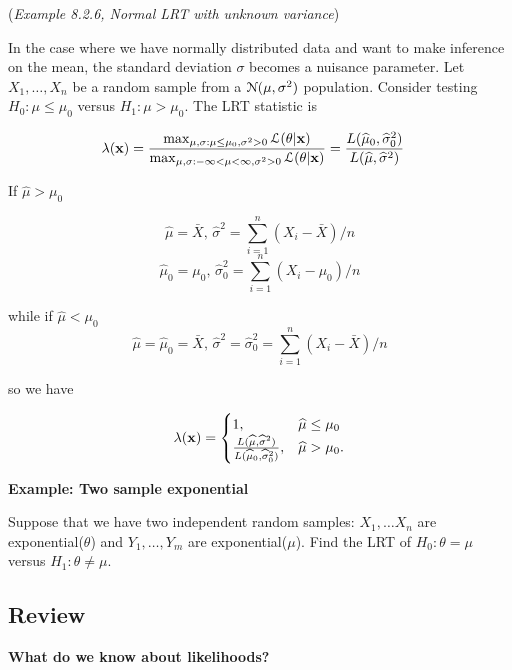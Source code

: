 \documentclass[11pt,]{article}
\def\bx{{\bf x}}
\def\muhat{{\widehat\mu}}
\def\sigmahat{{\widehat\sigma}}
\def\Xbar{\bar{ X}}
\def\Lsc{{\cal L}}
\def\Nsc{{\cal N}}
\def\sumin{\sum_{i=1}^n}
\begin{document}
 (\emph{Example 8.2.6, Normal LRT with unknown
variance})

In the case where we have normally distributed data and want to make
inference on the mean, the standard deviation \(\sigma\) becomes a
nuisance parameter. Let \(X_1, \ldots, X_n\) be a random sample from a
\(\Nsc(\mu,\sigma^2)\) population. Consider testing
\(H_0: \mu \leq \mu_0\) versus \(H_1: \mu > \mu_0\). The LRT statistic
is

\begin{align*}
\lambda(\bx) &= \frac{\max_{\mu, \sigma: \mu \leq\mu_0, \sigma^2 >0 } \Lsc(\theta | \bx)}{\max_{\mu, \sigma: -\infty < \mu < \infty, \sigma^2 > 0} \Lsc(\theta | \bx)} 
= \frac{L(\muhat_0, \sigmahat_0^2)}{L(\muhat, \sigmahat^2)}
\end{align*}

If \(\muhat > \mu_0\)

\[\muhat = \Xbar, \, \sigmahat^2 = \sumin(X_i - \Xbar)/n\]
\[\muhat_0 = \mu_0, \, \sigmahat_0^2 = \sumin(X_i - \mu_0)/n\]

while if \(\muhat < \mu_0\)
\[\muhat = \muhat_0 = \Xbar, \, \sigmahat^2 = \sigmahat_0^2 = \sumin(X_i - \Xbar)/n\]

so we have

\[\lambda(\bx) = \begin{cases}
1, & \muhat  \leq \mu_0\\
\frac{L(\muhat, \sigmahat^2)}{L(\muhat_0, \sigmahat_0^2)}, & \muhat > \mu_0.
\end{cases}
\]

\textbf{Example: Two sample exponential}

Suppose that we have two independent random samples: \(X_1, \ldots X_n\)
are exponential(\(\theta\)) and \(Y_1, \ldots, Y_m\) are
exponential(\(\mu\)). Find the LRT of \(H_0: \theta = \mu\) versus
\(H_1: \theta \neq \mu\).

\hypertarget{review}{%
\subsection{Review}\label{review}}

\noindent\textbf{What do we know about likelihoods?}
\end{document}
